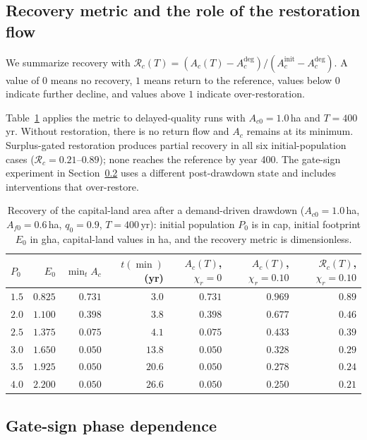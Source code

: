 \documentclass[11pt,a4paper]{article}
\begin{document}
\subsection{Recovery metric and the role of the restoration flow}\label{si:recovery}

We summarize recovery with $\mathcal R_c(T)=(A_c(T)-A_c^{\mathrm{deg}})/(A_c^{\mathrm{init}}-A_c^{\mathrm{deg}})$. A value of $0$ means no recovery, $1$ means return to the reference, values below $0$ indicate further decline, and values above $1$ indicate over-restoration.

Table~\ref{tab:si_recovery} applies the metric to delayed-quality runs with $A_{c0}=1.0$\,ha and $T=400$\,yr. Without restoration, there is no return flow and $A_c$ remains at its minimum. Surplus-gated restoration produces partial recovery in all six initial-population cases ($\mathcal R_c=0.21$--$0.89$); none reaches the reference by year 400. The gate-sign experiment in Section~\ref{si:gates} uses a different post-drawdown state and includes interventions that over-restore.

\begin{table}[htbp]
\centering\small
\caption{Recovery of the capital-land area after a demand-driven drawdown ($A_{c0}=1.0$\,ha, $A_{f0}=0.6$\,ha, $q_0=0.9$, $T=400$\,yr): initial population $P_0$ is in cap, initial footprint $E_0$ in gha, capital-land values in ha, and the recovery metric is dimensionless.}
\label{tab:si_recovery}
\begin{tabular}{l r r r r r r}
\toprule
$P_0$ & $E_0$ & $\min_tA_c$ & $t(\min)$ (yr) & $A_c(T)$, $\chi_r=0$ & $A_c(T)$, $\chi_r=0.10$ & $\mathcal R_c(T)$, $\chi_r=0.10$ \\
\midrule
$1.5$ & $0.825$ & $0.731$ & $3.0$ & $0.731$ & $0.969$ & $0.89$ \\
$2.0$ & $1.100$ & $0.398$ & $3.8$ & $0.398$ & $0.677$ & $0.46$ \\
$2.5$ & $1.375$ & $0.075$ & $4.1$ & $0.075$ & $0.433$ & $0.39$ \\
$3.0$ & $1.650$ & $0.050$ & $13.8$ & $0.050$ & $0.328$ & $0.29$ \\
$3.5$ & $1.925$ & $0.050$ & $20.6$ & $0.050$ & $0.278$ & $0.24$ \\
$4.0$ & $2.200$ & $0.050$ & $26.6$ & $0.050$ & $0.250$ & $0.21$ \\
\bottomrule
\end{tabular}
\end{table}

\subsection{Gate-sign phase dependence}\label{si:gates}
\end{document}
